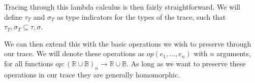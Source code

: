         \begin{prooftree}
        \end{prooftree}

        Tracing through this lambda calculus is then fairly straightforward.
        We will define $\tau_T$ and $\sigma_T$ as type indicators for the types of the trace, such that $\tau_T,\sigma_T\subseteq\tau,\sigma$.

        \begin{prooftree}
        \end{prooftree}

        \begin{prooftree}
        \end{prooftree}

        \begin{prooftree}
        \end{prooftree}

        \begin{prooftree}
        \end{prooftree}

        \begin{prooftree}
        \end{prooftree}

        We can then extend this with the basic operations we wish to preserve through our trace.
        We will denote these operations as $op(e_1,\dots,e_n)$ with $n$ arguments, for all functions $op:(\mathbb{R}\cup\mathbb{B})_n\to\mathbb{R}\cup\mathbb{B}$.
        As long as we want to preserve these operations in our trace they are generally homomorphic.

